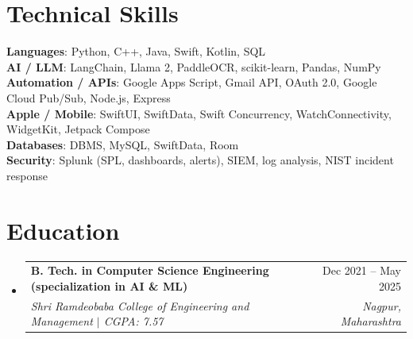 \documentclass[a4paper,11pt]{article}
\makeatletter
\newcommand{\resumeSubheading}[4]{
  \vspace{-1pt}\item
    \begin{tabularx}{0.97\textwidth}[t]{@{}>{\raggedright\arraybackslash}X@{\hspace{0.75em}}r@{}}
      \textbf{#1} & #2 \\
      \textit{\small#3} & \textit{\small #4} \\
    \end{tabularx}\vspace{-3pt}
}
\newcommand{\resumeSubItemListStart}{\begin{itemize}[leftmargin=0.15in, label={}]}
\newcommand{\resumeSubItemListEnd}{\end{itemize}}
\makeatother
\begin{document}
\section{Technical Skills}
  \begin{itemize}[leftmargin=0.15in, label={}]
    \small{\item{
      \textbf{Languages}{: Python, C++, Java, Swift, Kotlin, SQL} \\
      \textbf{AI / LLM}{: LangChain, Llama 2, PaddleOCR, scikit-learn, Pandas, NumPy} \\
      \textbf{Automation / APIs}{: Google Apps Script, Gmail API, OAuth 2.0, Google Cloud Pub/Sub, Node.js, Express} \\
      \textbf{Apple / Mobile}{: SwiftUI, SwiftData, Swift Concurrency, WatchConnectivity, WidgetKit, Jetpack Compose} \\
      \textbf{Databases}{: DBMS, MySQL, SwiftData, Room} \\
      \textbf{Security}{: Splunk (SPL, dashboards, alerts), SIEM, log analysis, NIST incident response}
    }}
  \end{itemize}

\section{Education}
  \resumeSubItemListStart
    \resumeSubheading
      {B. Tech. in Computer Science Engineering (specialization in AI \& ML)}{Dec 2021 -- May 2025}
      {Shri Ramdeobaba College of Engineering and Management $|$ CGPA: 7.57}{Nagpur, Maharashtra}
  \resumeSubItemListEnd
\end{document}
